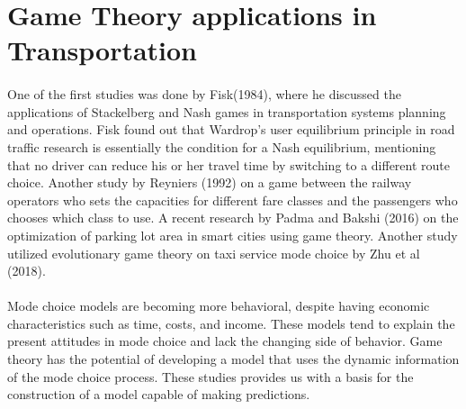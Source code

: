 \section{Game Theory applications in Transportation}
\paragraph{} One of the first studies was done by Fisk(1984), where he discussed the applications of Stackelberg and Nash games in transportation systems planning and operations. Fisk found out that Wardrop's user equilibrium principle in road traffic research is essentially the condition for a Nash equilibrium, mentioning that no driver can reduce his or her travel time by switching to a different route choice. Another study by Reyniers (1992) on a game between the railway operators who sets the capacities for different fare classes and the passengers who chooses which class to use. A recent research by Padma and Bakshi (2016) on the optimization of parking lot area in smart cities using game theory. Another study utilized evolutionary game theory on taxi service mode choice by Zhu et al (2018).  

\paragraph{}
Mode choice models are becoming more behavioral, despite having economic characteristics such as time, costs, and income.  These models tend to explain the present attitudes in mode choice and lack the changing side of behavior. Game theory has the potential of developing a model that uses the dynamic information of the mode choice process. These studies provides us with a basis for the construction of a model capable of making predictions.